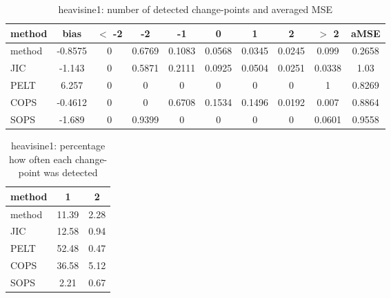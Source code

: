 \begin{table}[ht]
\centering
\begin{tabular}{l|c|ccccccc|c}
  \hline
method & bias & $<$ -2 & -2 & -1 & 0 & 1 & 2 & $>$ 2 & aMSE \\ 
  \hline
method & -0.8575 &     0 & 0.6769 & 0.1083 & 0.0568 & 0.0345 & 0.0245 & 0.099 & 0.2658 \\ 
  JIC & -1.143 &     0 & 0.5871 & 0.2111 & 0.0925 & 0.0504 & 0.0251 & 0.0338 &  1.03 \\ 
  PELT & 6.257 &     0 &     0 &     0 &     0 &     0 &     0 &     1 & 0.8269 \\ 
  COPS & -0.4612 &     0 &     0 & 0.6708 & 0.1534 & 0.1496 & 0.0192 & 0.007 & 0.8864 \\ 
  SOPS & -1.689 &     0 & 0.9399 &     0 &     0 &     0 &     0 & 0.0601 & 0.9558 \\ 
   \hline
\end{tabular}
\caption{heavisine1: number of detected change-points and averaged MSE} 
\label{tab:heavisine1Njumps}
\end{table}
\begin{table}[ht]
\centering
\begin{tabular}{l|cc}
  \hline
method & 1 & 2 \\ 
  \hline
method &  11.39 &   2.28 \\ 
  JIC &  12.58 &   0.94 \\ 
  PELT &  52.48 &   0.47 \\ 
  COPS &  36.58 &   5.12 \\ 
  SOPS &   2.21 &   0.67 \\ 
   \hline
\end{tabular}
\caption{heavisine1: percentage how often each change-point was detected} 
\label{tab:heavisine1Detections}
\end{table}
